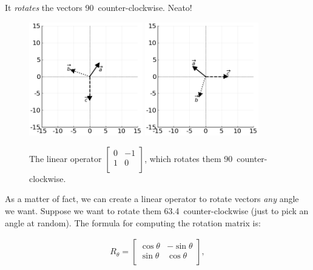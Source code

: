 It \textit{rotates} the vectors 90\textdegree\ counter-clockwise. Neato!

\begin{figure}[ht]
\centering
\vspace{.2in}
\includegraphics[width=0.44\textwidth]{preoperators.png}
\includegraphics[width=0.44\textwidth]{rotate90op.png}
\caption[.]{The linear operator 
{\scriptsize $\begin{bmatrix} 0 & -1 \\ 1 & 0 \\
\end{bmatrix}$,} which rotates them 90\textdegree\ counter-clockwise.}
\label{fig:rotate90op}
\end{figure}


As a matter of fact, we can create a linear operator to rotate vectors
\textit{any} angle we want. Suppose we want to rotate them 63.4\textdegree\
counter-clockwise (just to pick an angle at random). The formula for computing
the rotation matrix is:

\vspace{-.15in}
\begin{align*}
R_{\theta} =
\begin{bmatrix}
\cos \theta & -\sin \theta \\
\sin \theta & \cos \theta \\
\end{bmatrix},
\end{align*}
\vspace{-.15in}

